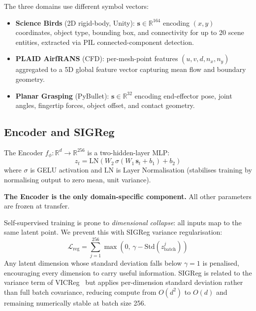 \documentclass[10pt,twocolumn]{article}
\begin{document}
The three domains use different symbol vectors:
\begin{itemize}[leftmargin=*,topsep=2pt,itemsep=1pt]
\item \textbf{Science Birds} (2D rigid-body, Unity): $\mathbf{s} \in \mathbb{R}^{164}$
  encoding $(x,y)$ coordinates, object type, bounding box, and connectivity for up to
  20 scene entities, extracted via PIL connected-component detection.
\item \textbf{PLAID AirfRANS} (CFD): per-mesh-point features $(u,v,d,n_x,n_y)$ aggregated
  to a 5D global feature vector capturing mean flow and boundary geometry.
\item \textbf{Planar Grasping} (PyBullet): $\mathbf{s} \in \mathbb{R}^{32}$ encoding
  end-effector pose, joint angles, fingertip forces, object offset, and contact geometry.
\end{itemize}

\subsection{Encoder and SIGReg}

The Encoder $f_\phi : \mathbb{R}^d \to \mathbb{R}^{256}$ is a two-hidden-layer MLP:
\begin{equation}
z_t = \mathrm{LN}\!\left(W_2\,\sigma\!\left(W_1\,\mathbf{s}_t + b_1\right) + b_2\right)
\label{eq:encoder}
\end{equation}
where $\sigma$ is GELU activation and $\mathrm{LN}$ is Layer Normalisation (stabilises
training by normalising output to zero mean, unit variance).

\textbf{The Encoder is the only domain-specific component.} All other parameters are frozen
at transfer.

Self-supervised training is prone to \emph{dimensional collapse}: all inputs map to the
same latent point. We prevent this with SIGReg variance regularisation:
\begin{equation}
\mathcal{L}_{\mathrm{reg}} = \sum_{j=1}^{256} \max\!\left(0,\, \gamma - \mathrm{Std}(z^j_{\mathrm{batch}})\right)
\label{eq:sigreg}
\end{equation}
Any latent dimension whose standard deviation falls below $\gamma = 1$ is penalised,
encouraging every dimension to carry useful information.
SIGReg is related to the variance term of VICReg~\citep{bardes2022vicreg} but applies
per-dimension standard deviation rather than full batch covariance, reducing compute
from $O(d^2)$ to $O(d)$ and remaining numerically stable at batch size 256.
\end{document}
